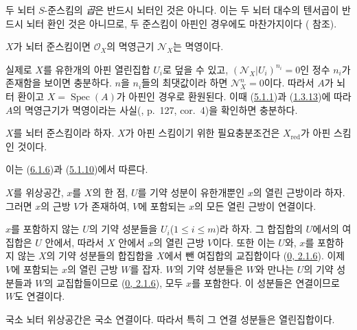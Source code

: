 \begin{env}[6.1.5]
\label{I.6.1.5-ko}
두 뇌터 $S$-준스킴의 \emph{곱}은 반드시 뇌터인 것은 아니다. 이는
두 뇌터 대수의 텐서곱이 반드시 뇌터 환인 것은 아니므로, 두
준스킴이 아핀인 경우에도 마찬가지이다
( 참조).
\end{env}

\begin{proposition}[6.1.6]
\label{I.6.1.6-ko}
$X$가 뇌터 준스킴이면 $\mathscr{O}_X$의 멱영근기
$\mathscr{N}_X$는 멱영이다.
\end{proposition}

실제로 $X$를 유한개의 아핀 열린집합 $U_i$로 덮을 수 있고,
$(\mathscr{N}_X|U_i)^{n_i}=0$인 정수 $n_i$가 존재함을 보이면
충분하다. $n$을 $n_i$들의 최댓값이라 하면
$\mathscr{N}_X^n=0$이다. 따라서 $A$가 뇌터 환이고
$X=\operatorname{Spec}(A)$가 아핀인 경우로 환원된다. 이때
(\hyperref[I.5.1.1-ko]{5.1.1})과
(\hyperref[I.1.3.13-ko]{1.3.13})에 따라 $A$의 멱영근기가 멱영이라는
사실(\cite{I-11}, p.~127, cor.~4)을 확인하면 충분하다.

\begin{corollary}[6.1.7]
\label{I.6.1.7-ko}
$X$를 뇌터 준스킴이라 하자. $X$가 아핀 스킴이기 위한
필요충분조건은 $X_{\mathrm{red}}$가 아핀 스킴인 것이다.
\end{corollary}

이는 (\hyperref[I.6.1.6-ko]{6.1.6})과
(\hyperref[I.5.1.10-ko]{5.1.10})에서 따른다.

\begin{lemma}[6.1.8]
\label{I.6.1.8-ko}
$X$를 위상공간, $x$를 $X$의 한 점, $U$를 기약 성분이 유한개뿐인
$x$의 열린 근방이라 하자. 그러면 $x$의 근방 $V$가 존재하여,
$V$에 포함되는 $x$의 모든 열린 근방이 연결이다.
\end{lemma}

$x$를 포함하지 않는 $U$의 기약 성분들을 $U_i$($1\leq i\leq m$)라
하자. 그 합집합의 $U$에서의 여집합은 $U$ 안에서, 따라서 $X$ 안에서
$x$의 열린 근방 $V$이다. 또한 이는 $U$와, $x$를 포함하지 않는
$X$의 기약 성분들의 합집합을 $X$에서 뺀 여집합의 교집합이다
(\hyperref[0.2.1.6-ko]{0, 2.1.6}). 이제 $V$에 포함되는 $x$의 열린
근방 $W$를 잡자. $W$의 기약 성분들은 $W$와 만나는 $U$의 기약
성분들과 $W$의 교집합들이므로
(\hyperref[0.2.1.6-ko]{0, 2.1.6}), 모두 $x$를 포함한다. 이 성분들은
연결이므로 $W$도 연결이다.

\begin{corollary}[6.1.9]
\label{I.6.1.9-ko}
국소 뇌터 위상공간은 국소 연결이다. 따라서 특히 그 연결 성분들은
열린집합이다.
\end{corollary}

